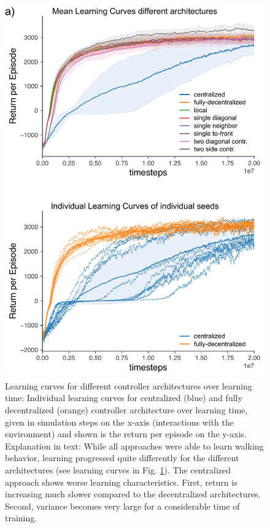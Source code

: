 \begin{figure}[tb]
\centering
\includegraphics[width=0.7\columnwidth]{img/07_LearningCurves.pdf}%
\caption{Learning curves for different controller architectures over learning time: Individual learning curves for centralized (blue) and fully decentralized (orange) controller architecture over learning time, given in simulation steps on the x-axis (interactions with the environment) and shown is the return per episode on the y-axis. Explanation in text: While all approaches were able to learn walking behavior, learning progressed quite differently for the different architectures (see learning curves in Fig. \ref{fig_res_learning_curves}). The centralized approach shows worse learning characteristics. First, return is increasing much slower compared to the decentralized architectures. Second, variance becomes very large for a considerable time of training.}
\label{fig_res_learning_curves}
\end{figure}

